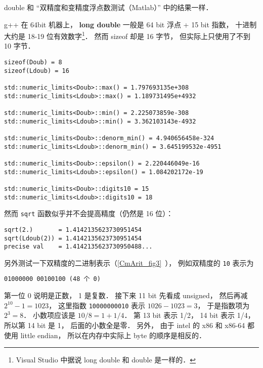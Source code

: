 
\begin{issues}
\issueDraft
\end{issues}


double 和 “双精度和变精度浮点数测试（Matlab）” 中的结果一样．

g++ 在 64bit 机器上， \textbf{long double} 一般是 64 bit 浮点 + 15 bit 指数， 十进制大约是 18-19 位有效数字\footnote{Visual Studio 中据说 long double 和 double 是一样的．}． 然而 sizeof 却是 16 字节， 但实际上只使用了不到 10 字节．

\begin{lstlisting}
sizeof(Doub) = 8
sizeof(Ldoub) = 16

std::numeric_limits<Doub>::max() = 1.797693135e+308
std::numeric_limits<Ldoub>::max() = 1.189731495e+4932

std::numeric_limits<Doub>::min() = 2.225073859e-308
std::numeric_limits<Ldoub>::min() = 3.362103143e-4932

std::numeric_limits<Doub>::denorm_min() = 4.940656458e-324
std::numeric_limits<Ldoub>::denorm_min() = 3.645199532e-4951

std::numeric_limits<Doub>::epsilon() = 2.220446049e-16
std::numeric_limits<Ldoub>::epsilon() = 1.084202172e-19

std::numeric_limits<Doub>::digits10 = 15
std::numeric_limits<Ldoub>::digits10 = 18
\end{lstlisting}

然而 \verb|sqrt| 函数似乎并不会提高精度（仍然是 16 位）：
\begin{lstlisting}
sqrt(2.)       = 1.4142135623730951454
sqrt(Ldoub(2)) = 1.4142135623730951454
precise val    = 1.4142135623730950488...
\end{lstlisting}

另外测试一下双精度的二进制表示（\autoref{CmArit_fig3}~）， 例如双精度的 \verb|10| 表示为
\begin{lstlisting}
01000000 00100100 (48 个 0)
\end{lstlisting}
第一位 0 说明是正数， 1 是复数． 接下来 11 bit 先看成 unsigned， 然后再减 $2^{10}-1 = 1023$， 这里指数 \verb|10000000010| 表示 $1026-1023 = 3$， 于是指数项为 $2^{3} = 8$． 小数项应该是 $10/8 = 1+1/4$． 第 13 bit 表示 1/2， 14 bit 表示 1/4， 所以第 14 bit 是 1， 后面的小数全是零． 另外， 由于 intel 的 x86 和 x86-64 都使用 little endian， 所以在内存中实际上 byte 的顺序是相反的．

